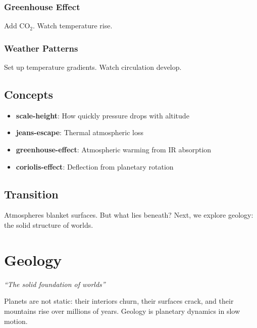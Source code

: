 \documentclass[
  11pt,
  letterpaper,
  twoside,
  openright]{book}
\providecommand{\tightlist}{%
  \setlength{\itemsep}{0pt}\setlength{\parskip}{0pt}}
\begin{document}
\subsection{Greenhouse Effect}\label{greenhouse-effect}

Add \(\text{CO}_2\). Watch temperature rise.

\subsection{Weather Patterns}\label{weather-patterns}

Set up temperature gradients. Watch circulation develop.

\section{Concepts}\label{concepts-16}

\begin{itemize}
\tightlist
\item
  \textbf{scale-height}: How quickly pressure drops with altitude
\item
  \textbf{jeans-escape}: Thermal atmospheric loss
\item
  \textbf{greenhouse-effect}: Atmospheric warming from IR absorption
\item
  \textbf{coriolis-effect}: Deflection from planetary rotation
\end{itemize}

\section{Transition}\label{transition-16}

Atmospheres blanket surfaces. But what lies beneath? Next, we explore
geology: the solid structure of worlds.

\chapter{Geology}\label{sec-geology}

\emph{``The solid foundation of worlds''}

\begin{tcolorbox}[enhanced jigsaw, coltitle=black, colbacktitle=quarto-callout-note-color!10!white, toprule=.15mm, colframe=quarto-callout-note-color-frame, arc=.35mm, opacityback=0, bottomtitle=1mm, toptitle=1mm, breakable, colback=white, titlerule=0mm, opacitybacktitle=0.6, title=\textcolor{quarto-callout-note-color}{\faInfo}\hspace{0.5em}{Key Revelation}, rightrule=.15mm, bottomrule=.15mm, leftrule=.75mm, left=2mm]

Planets are not static: their interiors churn, their surfaces crack, and
their mountains rise over millions of years. Geology is planetary
dynamics in slow motion.

\end{tcolorbox}
\end{document}
